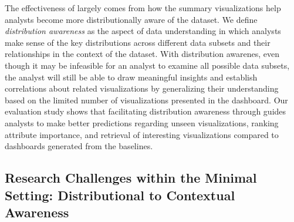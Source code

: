 \par The effectiveness of \sbd largely comes from how the summary visualizations help analysts become more distributionally aware of the dataset. We define \emph{distribution awareness} as the aspect of data understanding in which analysts make sense of the key distributions across different data subsets and their relationships in the context of the dataset. With distribution awarenes, even though it may be infeasible for an analyst to examine all possible data subsets, the analyst will still be able to draw meaningful insights and establish correlations about related visualizations by generalizing their understanding based on the limited number of visualizations presented in the dashboard. Our evaluation study shows that facilitating distribution awareness through \sbd guides analysts to make better predictions regarding unseen visualizations, ranking attribute importance, and retrieval of interesting visualizations compared to dashboards generated from the baselines. %
\subsection{Research Challenges within the Minimal Setting: Distributional to Contextual Awareness}

